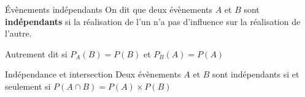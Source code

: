 \documentclass[oneside,12pt]{article}          %
\begin{document}
\begin{definition}{Évènements indépendants}
	On dit que deux évènements $A$ et $B$ sont \textbf{indépendants} si la réalisation de l'un n'a pas d'influence sur la réalisation de l'autre.
	
	Autrement dit si $P_A(B)=P(B)$ \quad et \quad $P_B(A)=P(A)$
\end{definition}



\begin{propriete}{Indépendance et intersection}
	Deux évènements $A$ et $B$ sont indépendants si et seulement si $P(A \cap B)=P(A) \times P(B)$
\end{propriete}
\end{document}
